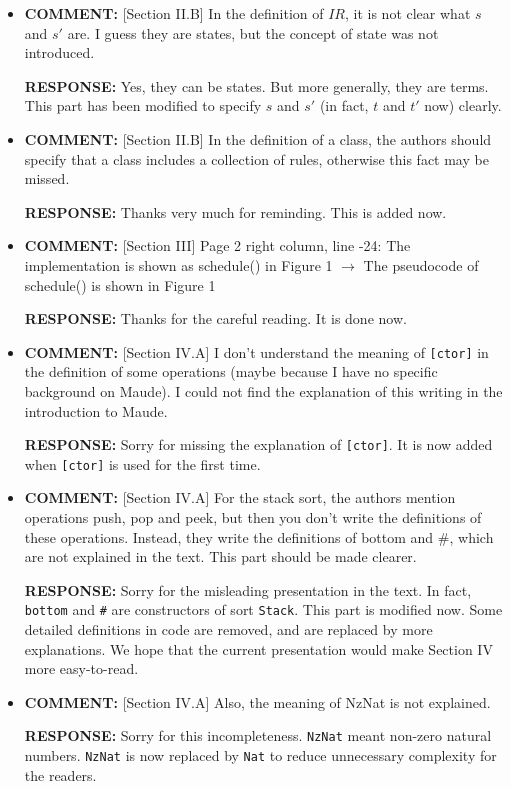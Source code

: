 \documentclass[10pt,journal]{IEEEtran}
\newcommand{\ANSWER}{{\bf RESPONSE: }}
\newcommand{\COMMENT}{{\bf COMMENT: }}
\begin{document}
\begin{itemize}
\item
\COMMENT [Section II.B] In the definition of $IR$, it is not clear
what $s$ and $s'$ are. I guess they are states, but the concept of
state was not introduced.

\ANSWER Yes, they can be states. But more generally, they are
terms. This part has been modified to specify $s$ and $s'$ (in fact,
$t$ and $t'$ now) clearly.

\item 
\COMMENT [Section II.B] In the definition of a class, the authors
should specify that a class includes a collection of rules, otherwise
this fact may be missed.

\ANSWER Thanks very much for reminding. This is added now.

\item
\COMMENT [Section III] Page 2 right column, line -24: The
implementation is shown as schedule() in Figure 1 $\rightarrow$ The
pseudocode of schedule() is shown in Figure 1

\ANSWER Thanks for the careful reading. It is done now.

\item 
\COMMENT [Section IV.A] I don't understand the meaning of
\verb|[ctor]| in the definition of some operations (maybe because I
have no specific background on Maude). I could not find the
explanation of this writing in the introduction to Maude.

\ANSWER Sorry for missing the explanation of \verb|[ctor]|. It is now
added when \verb|[ctor]| is used for the first time.

\item
\COMMENT [Section IV.A] For the stack sort, the authors mention
operations push, pop and peek, but then you don't write the
definitions of these operations. Instead, they write the definitions
of bottom and \#, which are not explained in the text. This part
should be made clearer.

\ANSWER Sorry for the misleading presentation in the text. In fact,
\verb|bottom| and \verb|#| are constructors of sort \verb|Stack|. This
part is modified now. Some detailed definitions in code are removed,
and are replaced by more explanations. We hope that the current
presentation would make Section IV more easy-to-read.

\item
\COMMENT [Section IV.A] Also, the meaning of NzNat is not explained.

\ANSWER Sorry for this incompleteness. \verb|NzNat| meant non-zero
natural numbers. \verb|NzNat| is now replaced by \verb|Nat| to reduce
unnecessary complexity for the readers.


\end{itemize}
\end{document}
